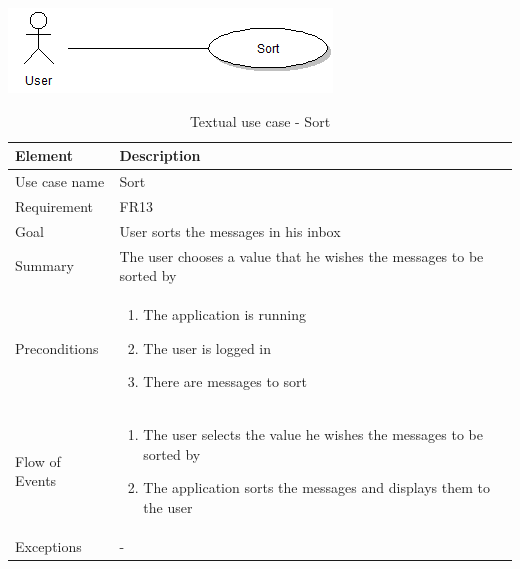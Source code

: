\begin{table}
\begin{center}
\begin{center}
\includegraphics[width=\textwidth]{sort}
\end{center}
\begin{tabular}{p{3cm}|p{12cm}} \hline
\textbf{Element} & \textbf{Description} \\ \hline \hline
Use case name & Sort \\
Requirement & FR13 \\
Goal & User sorts the messages in his inbox \\ \hline
Summary & The user chooses a value that he wishes the messages to be sorted by \\ \hline
Preconditions &
\begin{enumerate}
\item{}The application is running
\item{}The user is logged in
\item{}There are messages to sort
\end{enumerate} \\ \hline
Flow of Events &
\begin{enumerate}
\item{}The user selects the value he wishes the messages to be sorted by
\item{}The application sorts the messages and displays them to the user
\end{enumerate} \\ \hline
Exceptions & - \\ \hline
\end{tabular}
\end{center}
\caption{Textual use case - Sort} \label{tab:search}
\end{table}

